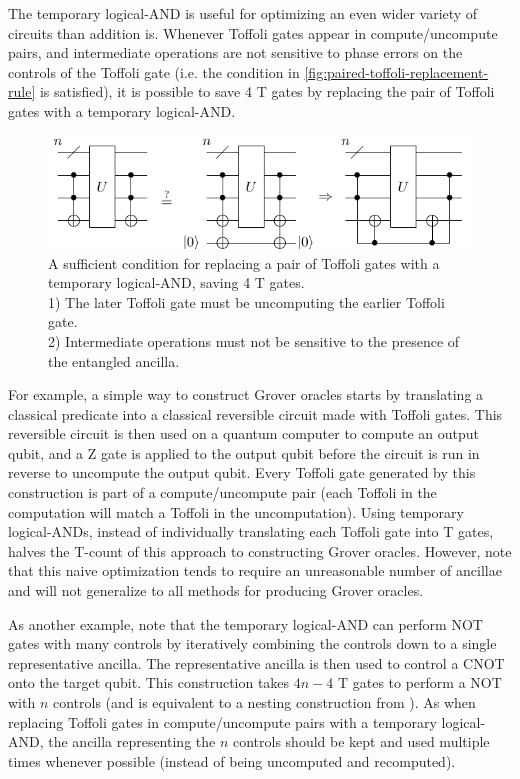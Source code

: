 \documentclass[twocolumn]{quantumarticle-customized}
\begin{document}
The temporary logical-AND is useful for optimizing an even wider variety of circuits than addition is.
Whenever Toffoli gates appear in compute/uncompute pairs, and intermediate operations are not sensitive to phase errors on the controls of the Toffoli gate (i.e. the condition in \autoref{fig:paired-toffoli-replacement-rule} is satisfied), it is possible to save 4 T gates by replacing the pair of Toffoli gates with a temporary logical-AND.

\begin{figure}
  \includegraphics[width=\linewidth]{paired-toffoli-replacement-rule.pdf}
  \caption{
	A sufficient condition for replacing a pair of Toffoli gates with a temporary logical-AND, saving 4 T gates.\\
	1) The later Toffoli gate must be uncomputing the earlier Toffoli gate.\\
	2) Intermediate operations must not be sensitive to the presence of the entangled ancilla.
  }
  \label{fig:paired-toffoli-replacement-rule}
\end{figure}

For example, a simple way to construct Grover oracles starts by translating a classical predicate into a classical reversible circuit made with Toffoli gates.
This reversible circuit is then used on a quantum computer to compute an output qubit, and a Z gate is applied to the output qubit before the circuit is run in reverse to uncompute the output qubit.
Every Toffoli gate generated by this construction is part of a compute/uncompute pair (each Toffoli in the computation will match a Toffoli in the uncomputation).
Using temporary logical-ANDs, instead of individually translating each Toffoli gate into T gates, halves the T-count of this approach to constructing Grover oracles.
However, note that this naive optimization tends to require an unreasonable number of ancillae and will not generalize to all methods for producing Grover oracles.

As another example, note that the temporary logical-AND can perform NOT gates with many controls by iteratively combining the controls down to a single representative ancilla.
The representative ancilla is then used to control a CNOT onto the target qubit.
This construction takes $4n-4$ T gates to perform a NOT with $n$ controls (and is equivalent to a nesting construction from \cite{Jones2013}).
As when replacing Toffoli gates in compute/uncompute pairs with a temporary logical-AND, the ancilla representing the $n$ controls should be kept and used multiple times whenever possible (instead of being uncomputed and recomputed).
\end{document}
